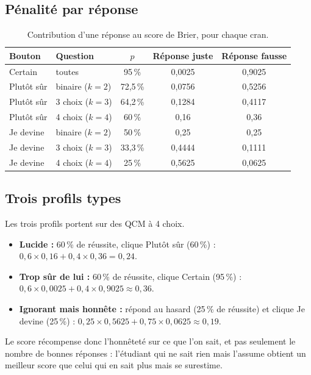 \documentclass[11pt,a4paper]{article}
\begin{document}
\begin{appendices}
\subsection{Pénalité par réponse}
\begin{table}[H]
  \centering
  \small
  \begin{tabular}{@{}llccc@{}}
    \toprule
    \textbf{Bouton} & \textbf{Question} & \textbf{$p$} & \textbf{Réponse juste} & \textbf{Réponse fausse} \\
    \midrule
    Certain & toutes & 95\,\% & 0,0025 & 0,9025 \\
    \midrule
    Plutôt sûr & binaire ($k=2$) & 72,5\,\% & 0,0756 & 0,5256 \\
    Plutôt sûr & 3 choix ($k=3$) & 64,2\,\% & 0,1284 & 0,4117 \\
    Plutôt sûr & 4 choix ($k=4$) & 60\,\% & 0,16 & 0,36 \\
    \midrule
    Je devine & binaire ($k=2$) & 50\,\% & 0,25 & 0,25 \\
    Je devine & 3 choix ($k=3$) & 33,3\,\% & 0,4444 & 0,1111 \\
    Je devine & 4 choix ($k=4$) & 25\,\% & 0,5625 & 0,0625 \\
    \bottomrule
  \end{tabular}
  \caption{Contribution d'une réponse au score de Brier, pour chaque cran.}
\end{table}

\subsection{Trois profils types}
Les trois profils portent sur des QCM à 4 choix.
\begin{itemize}[leftmargin=*, nosep]
  \item \textbf{Lucide :} 60\,\% de réussite, clique \og Plutôt sûr \fg{} (60\,\%) : $0{,}6 \times 0{,}16 + 0{,}4 \times 0{,}36 = 0{,}24$.
  \item \textbf{Trop sûr de lui :} 60\,\% de réussite, clique \og Certain \fg{} (95\,\%) : $0{,}6 \times 0{,}0025 + 0{,}4 \times 0{,}9025 \approx 0{,}36$.
  \item \textbf{Ignorant mais honnête :} répond au hasard (25\,\% de réussite) et clique \og Je devine \fg{} (25\,\%) : $0{,}25 \times 0{,}5625 + 0{,}75 \times 0{,}0625 \approx 0{,}19$.
\end{itemize}
Le score récompense donc l'honnêteté sur ce que l'on sait, et pas seulement le nombre de bonnes réponses : l'étudiant qui ne sait rien mais l'assume obtient un meilleur score que celui qui en sait plus mais se surestime.


\end{appendices}
\end{document}
